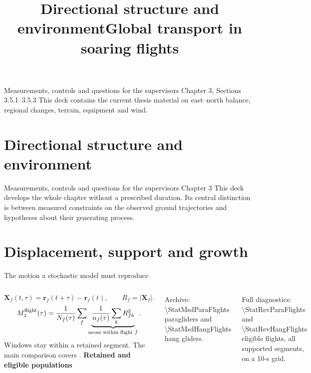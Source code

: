 \documentclass[11pt,aspectratio=169]{beamer}
\title{Directional structure and environment}
\title{Global transport in soaring flights}
\begin{document}
\ifdefined\SectionThreeFiveOnly
{}
 {Measurements, controls and questions for the supervisors}
 {Chapter 3, Sections 3.5.1--3.5.3}
 {This deck contains the current thesis material on east--north balance, regional changes, terrain, equipment and wind.}
\section{Directional structure and environment}
\else
{}
 {Measurements, controls and questions for the supervisors}
 {Chapter 3}
{This deck develops the whole chapter without a prescribed duration. Its central distinction is between measured constraints on the observed ground trajectories and hypotheses about their generating process.}
\section{Displacement, support and growth}

\begin{frame}{The motion a stochastic model must reproduce}
\begin{columns}[T,onlytextwidth]
\[
 \mathbf X_f(t,\tau)=\mathbf r_f(t+\tau)-\mathbf r_f(t),\qquad R_f=|\mathbf X_f|.
\]
\[
 M_2^{\rm flight}(\tau)=\frac{1}{N_f(\tau)}
       \sum_f\underbrace{\frac1{n_f(\tau)}\sum_k R_{fk}^2}_{\text{mean within flight }f}.
\]
\small Windows stay within a retained segment. The main comparison covers
.
\small
\textbf{Retained and eligible populations}\par\medskip
Archive: \num{\StatMsdParaFlights} paragliders and \num{\StatMsdHangFlights} hang gliders.\par\medskip
Full diagnostics: \num{\StatRevParaFlights} and \num{\StatRevHangFlights} eligible flights, all supported segments, on a 10-s grid.
\end{columns}
\end{frame}
\end{document}
